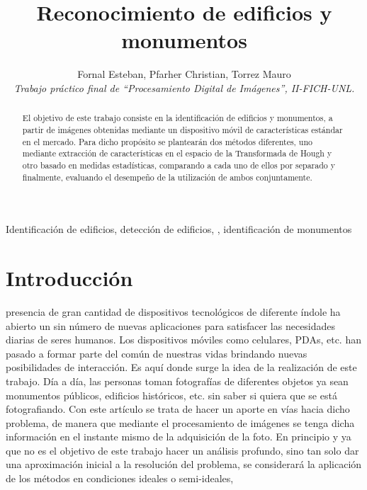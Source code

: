 \documentclass[conference,spanish,a4paper,10pt,oneside,final]{tfmpd}
\begin{document}
\title{Reconocimiento de edificios y monumentos}
\author{Fornal Esteban, Pfarher Christian, Torrez Mauro\\
\textit{Trabajo práctico final de ``Procesamiento Digital de
Imágenes'', II-FICH-UNL.}}
\maketitle
%
%
%
%
\begin{abstract}
El objetivo de este trabajo consiste en la identificación de edificios y monumentos, a partir de imágenes obtenidas mediante un dispositivo móvil de características estándar en el mercado. Para dicho propósito se plantearán dos métodos diferentes, uno mediante extracción de características en el espacio de la Transformada de Hough y otro basado en medidas estadísticas, comparando a cada uno de ellos por separado y finalmente, evaluando el desempeño de la utilización de ambos conjuntamente.
\end{abstract}
%
%
%
%
\begin{keywords}
Identificación de edificios, detección de edificios, , identificación de monumentos
\end{keywords}
%
%
%
%
\section{Introducción}
 presencia de gran cantidad de dispositivos tecnológicos de diferente índole ha abierto un sin número de nuevas aplicaciones para satisfacer las necesidades diarias de seres humanos. Los dispositivos móviles como celulares, PDAs, etc. han pasado a formar parte del común de nuestras vidas brindando nuevas posibilidades de interacción. Es aquí donde surge la idea de la realización de este trabajo. 
Día a día, las personas toman fotografías de diferentes objetos ya sean monumentos públicos, edificios históricos, etc. sin saber si quiera que se está fotografiando. Con este artículo se trata de hacer un aporte en vías hacia dicho problema, de manera que mediante el procesamiento de imágenes se tenga dicha información en el instante mismo de la adquisición de la foto.
En principio y ya que no es el objetivo de este trabajo hacer un análisis profundo, sino tan solo dar una aproximación inicial a la resolución del problema, se considerará la aplicación de los métodos en condiciones ideales o semi-ideales, 
%
%
%
%
\end{document}

